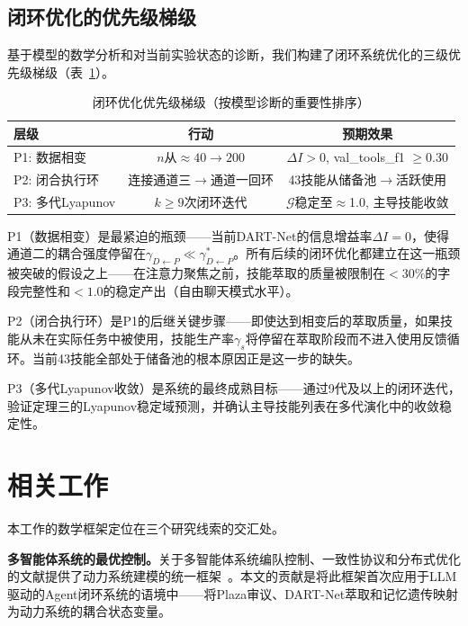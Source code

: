 \documentclass[twocolumn,10.5pt]{ctexart}
\def\cG{\mathcal{G}}
\begin{document}
\subsection{闭环优化的优先级梯级}

基于模型的数学分析和对当前实验状态的诊断，我们构建了闭环系统优化的三级优先级梯级（表~\ref{tab:priority}）。

\begin{table}[t]
\centering
\caption{闭环优化优先级梯级（按模型诊断的重要性排序）}
\label{tab:priority}
\setlength{\tabcolsep}{2pt}
\renewcommand{\arraystretch}{1.15}
\begin{tabular}{lcc}
\toprule
层级 & 行动 & 预期效果 \\
\midrule
P1: 数据相变 & $n$从$\approx 40 \to 200$ & $\Delta I > 0$, val\_tools\_f1 $\geq 0.30$ \\
P2: 闭合执行环 & 连接通道三$\to$通道一回环 & 43技能从储备池$\to$活跃使用 \\
P3: 多代Lyapunov & $k \geq 9$次闭环迭代 & $\cG$稳定至$\approx$1.0, 主导技能收敛 \\
\bottomrule
\end{tabular}
\end{table}

P1（数据相变）是最紧迫的瓶颈——当前DART-Net的信息增益率$\Delta I = 0$，使得通道二的耦合强度停留在$\gamma_{D\leftarrow P} \ll \gamma_{D\leftarrow P}^*$。所有后续的闭环优化都建立在这一瓶颈被突破的假设之上——在注意力聚焦之前，技能萃取的质量被限制在$<30\%$的字段完整性和$<1.0$的稳定产出（自由聊天模式水平）。

P2（闭合执行环）是P1的后继关键步骤——即使达到相变后的萃取质量，如果技能从未在实际任务中被使用，技能生产率$\gamma_s$将停留在萃取阶段而不进入使用反馈循环。当前43技能全部处于储备池的根本原因正是这一步的缺失。

P3（多代Lyapunov收敛）是系统的最终成熟目标——通过9代及以上的闭环迭代，验证定理三的Lyapunov稳定域预测，并确认主导技能列表在多代演化中的收敛稳定性。

\section{相关工作}

本工作的数学框架定位在三个研究线索的交汇处。

\textbf{多智能体系统的最优控制。}关于多智能体系统编队控制、一致性协议和分布式优化的文献提供了动力系统建模的统一框架~\cite{bonabeau1999swarm,theraulaz1998modeling}。本文的贡献是将此框架首次应用于LLM驱动的Agent闭环系统的语境中——将Plaza审议、DART-Net萃取和记忆遗传映射为动力系统的耦合状态变量。
\end{document}
